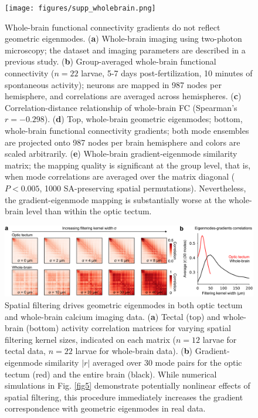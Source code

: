 \documentclass{article}
\begin{document}
\begin{figure}[t]
    \centering
    \texttt{[image: figures/supp\_wholebrain.png]}
    \caption{Whole-brain functional connectivity gradients do not reflect geometric eigenmodes. (\textbf{a}) Whole-brain imaging using two-photon microscopy; the dataset and imaging parameters are described in a previous study. (\textbf{b}) Group-averaged whole-brain functional connectivity ($n=22$ larvae, 5-7 days post-fertilization, 10 minutes of spontaneous activity); neurons are mapped in 987 nodes per hemisphere, and correlations are averaged across hemispheres. (\textbf{c}) Correlation-distance relationship of whole-brain FC (Spearman's $r=-0.298$). (\textbf{d}) Top, whole-brain geometric eigenmodes; bottom, whole-brain functional connectivity gradients; both mode ensembles are projected onto 987 nodes per brain hemisphere and colors are scaled arbitrarily. (\textbf{e}) Whole-brain gradient-eigenmode similarity matrix; the mapping quality is significant at the group level, that is, when mode correlations are averaged over the matrix diagonal ($P<0.005$, 1000 SA-preserving spatial permutations). Nevertheless, the gradient-eigenmode mapping is substantially worse at the whole-brain level than within the optic tectum.}
    \label{supp_wholebrain}
\end{figure}

\newpage

\begin{figure}[t]
    \centering
    \includegraphics[width=1.0\linewidth]{figures/supp_smoothing.png}
    \caption{Spatial filtering drives geometric eigenmodes in both optic tectum and whole-brain calcium imaging data. (\textbf{a}) Tectal (top) and whole-brain (bottom) activity correlation matrices for varying spatial filtering kernel sizes, indicated on each matrix ($n=12$ larvae for tectal data, $n=22$ larvae for whole-brain data). (\textbf{b}) Gradient-eigenmode similarity $|r|$ averaged over 30 mode pairs for the optic tectum (red) and the entire brain (black). While numerical simulations in Fig. \ref{fig5} demonstrate potentially nonlinear effects of spatial filtering, this procedure immediately increases the gradient correspondence with geometric eigenmodes in real data.}
    \label{supp_smoothing}
\end{figure}
\end{document}

